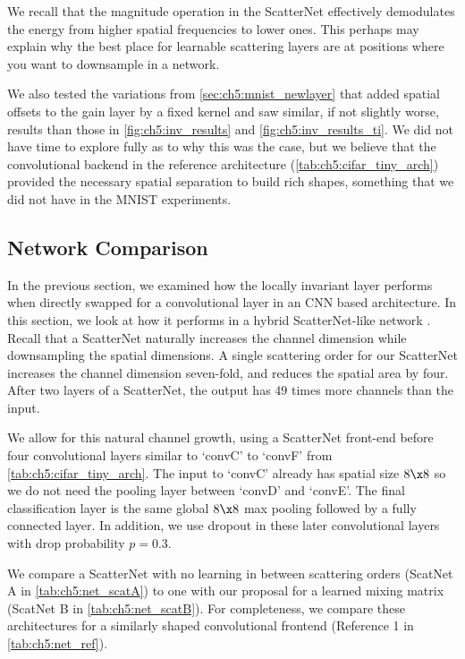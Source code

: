 We recall that the magnitude operation in the ScatterNet effectively
demodulates the energy from higher spatial frequencies to lower ones. This
perhaps may explain why the best place for learnable scattering layers
are at positions where you want to downsample in a network.
% 

We also tested the variations from \autoref{sec:ch5:mnist_newlayer} that added
spatial offsets to the gain layer by a fixed kernel and saw similar, if not
slightly worse, results than those in \autoref{fig:ch5:inv_results} and
\autoref{fig:ch5:inv_results_ti}. We did not
have time to explore fully as to why this was the case, but we believe that the
convolutional backend in the reference architecture (\autoref{tab:ch5:cifar_tiny_arch})
provided the necessary spatial separation to build rich shapes, something that
we did not have in the MNIST experiments.

\subsection{Network Comparison}\label{sec:ch5:scat_exp}


In the previous section, we examined how the locally invariant layer performs when
directly swapped for a convolutional layer in an CNN based architecture.
In this section, we look at how it performs in a hybrid ScatterNet-like network
\cite{oyallon_hybrid_2017,oyallon_scaling_2017}. Recall that a ScatterNet
naturally increases the channel dimension while downsampling the spatial
dimensions. A single scattering order for our ScatterNet increases the channel dimension 
seven-fold, and reduces the spatial area by four. After two layers of a
ScatterNet, the output has $49$ times more channels than the input.

We allow for this natural channel growth, using a ScatterNet front-end before
four convolutional layers similar to `convC' to `convF' from
\autoref{tab:ch5:cifar_tiny_arch}. The input to `convC' already has spatial size
$8\x 8$ so we do not need the pooling layer between `convD' and `convE'. The
final classification layer is the same global $8\x 8$ max pooling followed by a
fully connected layer. In addition, we use dropout in these later convolutional
layers with drop probability $p=0.3$.

We compare a ScatterNet with no learning in between scattering orders (ScatNet A
in \autoref{tab:ch5:net_scatA}) to one with our proposal for a learned mixing
matrix (ScatNet B in \autoref{tab:ch5:net_scatB}). For completeness, we
compare these architectures for a similarly shaped convolutional frontend
(Reference 1 in \autoref{tab:ch5:net_ref}).

